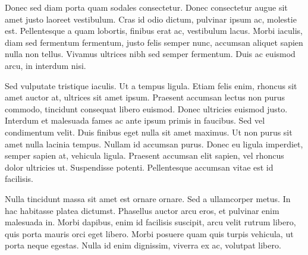 Donec sed diam porta quam sodales consectetur. Donec consectetur augue sit amet justo laoreet vestibulum. Cras id odio dictum, pulvinar ipsum ac, molestie est. Pellentesque a quam lobortis, finibus erat ac, vestibulum lacus. Morbi iaculis, diam sed fermentum fermentum, justo felis semper nunc, accumsan aliquet sapien nulla non tellus. Vivamus ultrices nibh sed semper fermentum. Duis ac euismod arcu, in interdum nisi.

Sed vulputate tristique iaculis. Ut a tempus ligula. Etiam felis enim, rhoncus sit amet auctor at, ultrices sit amet ipsum. Praesent accumsan lectus non purus commodo, tincidunt consequat libero euismod. Donec ultricies euismod justo. Interdum et malesuada fames ac ante ipsum primis in faucibus. Sed vel condimentum velit. Duis finibus eget nulla sit amet maximus. Ut non purus sit amet nulla lacinia tempus. Nullam id accumsan purus. Donec eu ligula imperdiet, semper sapien at, vehicula ligula. Praesent accumsan elit sapien, vel rhoncus dolor ultricies ut. Suspendisse potenti. Pellentesque accumsan vitae est id facilisis.

Nulla tincidunt massa sit amet est ornare ornare. Sed a ullamcorper metus. In hac habitasse platea dictumst. Phasellus auctor arcu eros, et pulvinar enim malesuada in. Morbi dapibus, enim id facilisis suscipit, arcu velit rutrum libero, quis porta mauris orci eget libero. Morbi posuere quam quis turpis vehicula, ut porta neque egestas. Nulla id enim dignissim, viverra ex ac, volutpat libero.



\blankpage

\glsresetall




